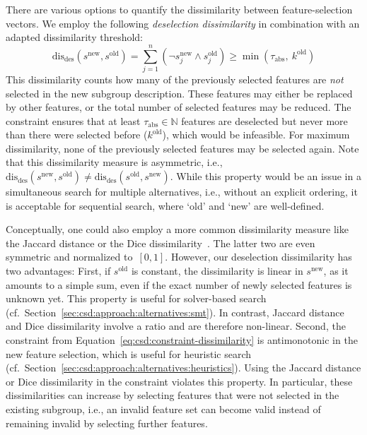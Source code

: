 \documentclass{article}
\theoremstyle{definition}
\begin{document}
There are various options to quantify the dissimilarity between feature-selection vectors.
We employ the following \emph{deselection dissimilarity} in combination with an adapted dissimilarity threshold:
%
\begin{equation}
	\text{dis}_{\text{des}}(s^{\text{new}}, s^{\text{old}}) = \sum_{j=1}^n (\lnot s^{\text{new}}_j \land s^{\text{old}}_j) \geq \min \left( \tau_{\text{abs}},~k^{\text{old}} \right)
	\label{eq:csd:constraint-dissimilarity}
\end{equation}
%
This dissimilarity counts how many of the previously selected features are \emph{not} selected in the new subgroup description.
These features may either be replaced by other features, or the total number of selected features may be reduced.
The constraint ensures that at least $\tau_{\text{abs}} \in \mathbb{N}$ features are deselected but never more than there were selected before ($k^{\text{old}}$), which would be infeasible.
For maximum dissimilarity, none of the previously selected features may be selected again.
Note that this dissimilarity measure is asymmetric, i.e., $\text{dis}_{\text{des}}(s^{\text{new}}, s^{\text{old}}) \neq \text{dis}_{\text{des}}(s^{\text{old}}, s^{\text{new}})$.
While this property would be an issue in a simultaneous search for multiple alternatives, i.e., without an explicit ordering, it is acceptable for sequential search, where `old' and `new' are well-defined.

Conceptually, one could also employ a more common dissimilarity measure like the Jaccard distance or the Dice dissimilarity~\cite{choi2010survey}.
The latter two are even symmetric and normalized to~$[0,1]$.
However, our deselection dissimilarity has two advantages:
First, if $s^{\text{old}}$ is constant, the dissimilarity is linear in $s^{\text{new}}$, as it amounts to a simple sum, even if the exact number of newly selected features is unknown yet.
This property is useful for solver-based search (cf.~Section~\ref{sec:csd:approach:alternatives:smt}).
In contrast, Jaccard distance and Dice dissimilarity involve a ratio and are therefore non-linear.
Second, the constraint from Equation~\ref{eq:csd:constraint-dissimilarity} is antimonotonic in the new feature selection, which is useful for heuristic search (cf.~Section~\ref{sec:csd:approach:alternatives:heuristics}).
Using the Jaccard distance or Dice dissimilarity in the constraint violates this property.
In particular, these dissimilarities can increase by selecting features that were not selected in the existing subgroup, i.e., an invalid feature set can become valid instead of remaining invalid by selecting further features.
\end{document}
